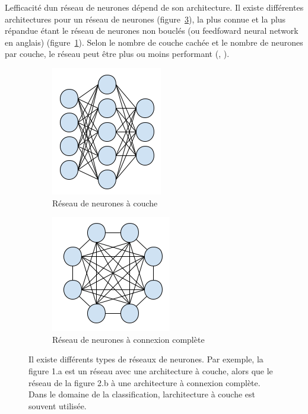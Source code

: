 \documentclass[11pt,final,ENIB]{sdm}
\begin{document}
			L\textquotesingle efficacit\'e d\textquotesingle un r\'eseau de neurones d\'epend de son architecture.
			Il existe diff\'erentes architectures pour un r\'eseau de neurones (figure~\ref{fig:neuralNetwork}), la plus connue et la plus r\'epandue \'etant le r\'eseau de neurones non boucl\'es (ou feedfoward neural network en anglais) (figure~\ref{fig:nnl}). Selon le nombre de couche cach\'ee et le nombre de neurones par couche, le r\'eseau peut \^etre plus ou moins performant (\cite{chatfield2014return}, \cite{srivastava2014dropout}). 

			\begin{figure}[!ht]
				\centering
				\begin{subfigure}{0.45\textwidth}
					\centering	
					\includegraphics[scale=0.7,natwidth=183,natheight=213]{figures/neuralNetworkLayers.png}
					\caption{R\'eseau de neurones \`a couche}
					\label{fig:nnl}
				\end{subfigure}
				\hspace*{\fill}
				\begin{subfigure}{0.45\textwidth}	
					\centering
					\includegraphics[scale=0.7,natwidth=198,natheight=192]{figures/neuralNetworkCompleteConnexion.png}
					\caption{R\'eseau de neurones \`a connexion compl\`ete}
					\label{fig:nnc}
				\end{subfigure}
				\caption{Il existe diff\'erents types de r\'eseaux de neurones. Par exemple, la figure 1.a est un r\'eseau avec une architecture \`a couche, alors que le r\'eseau de la figure 2.b \`a une architecture \`a connexion compl\`ete. Dans le domaine de la classification, l\textquotesingle architecture \`a couche est souvent utilis\'ee.}
				\label{fig:neuralNetwork}
			\end{figure}
			
\end{document}
